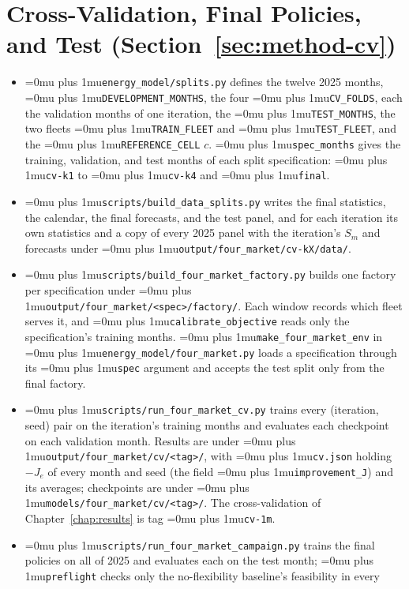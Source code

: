 \documentclass{UNCC-thesis}
\newcommand{\codepath}[1]{{\Urlmuskip=0mu plus 1mu\relax\nolinkurl{#1}}}
\begin{document}
\section{Cross-Validation, Final Policies, and Test
  (Section~\ref{sec:method-cv})}
\begin{itemize}
  \item \codepath{energy_model/splits.py} defines the twelve 2025 months,
        \codepath{DEVELOPMENT_MONTHS}, the four \codepath{CV_FOLDS}, each the
        validation months of one iteration, the
        \codepath{TEST_MONTHS}, the two fleets \codepath{TRAIN_FLEET} and
        \codepath{TEST_FLEET}, and the \codepath{REFERENCE_CELL} \(c\).
        \codepath{spec_months} gives the training, validation, and test
        months of each split specification: \codepath{cv-k1} to
        \codepath{cv-k4} and \codepath{final}.
  \item \codepath{scripts/build_data_splits.py} writes the final statistics,
        the calendar, the final forecasts, and the test panel, and for each
        iteration its own statistics and a copy of every 2025 panel with the
        iteration's \(S_m\) and forecasts under
        \codepath{output/four_market/cv-kX/data/}.
  \item \codepath{scripts/build_four_market_factory.py} builds one
        factory per specification under
        \codepath{output/four_market/<spec>/factory/}. Each window
        records which fleet serves it, and \codepath{calibrate_objective}
        reads only the specification's training months.
        \codepath{make_four_market_env} in
        \codepath{energy_model/four_market.py} loads a specification
        through its \codepath{spec} argument and accepts the test split only
        from the final factory.
  \item \codepath{scripts/run_four_market_cv.py} trains every (iteration, seed)
        pair on the iteration's training months and evaluates each checkpoint on
        each validation month. Results are under
        \codepath{output/four_market/cv/<tag>/}, with
        \codepath{cv.json} holding \(-J_e\) of every month and seed (the field
        \codepath{improvement_J}) and its averages; checkpoints are under
        \codepath{models/four_market/cv/<tag>/}. The cross-validation
        of Chapter~\ref{chap:results} is tag \codepath{cv-1m}.
  \item \codepath{scripts/run_four_market_campaign.py} trains the final
        policies on all of 2025 and evaluates each on the test month;
        \codepath{preflight} checks only the no-flexibility baseline's feasibility in every

\end{itemize}
\end{document}
